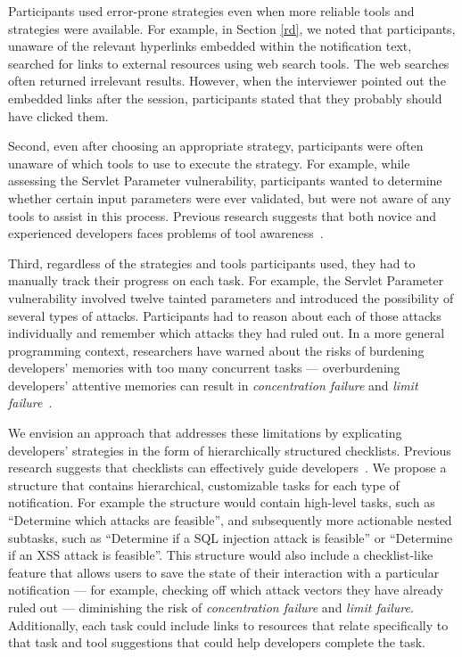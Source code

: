 \documentclass{acm_proc_article-sp}
\begin{document}
Participants used error-prone strategies even when more reliable tools and strategies were available. 
For example, in Section \ref{rd}, we noted that participants, unaware of the relevant hyperlinks embedded within the notification text, searched for links to external resources using web search tools. 
The web searches often returned irrelevant results. 
However, when the interviewer pointed out the embedded links after the session, participants stated that they probably should have clicked them. 

Second, even after choosing an appropriate strategy, participants were often unaware of which tools to use to execute the strategy.
For example, while assessing the Servlet Parameter vulnerability, participants wanted to determine whether certain input parameters were ever validated, but were not aware of any tools to assist in this process.
Previous research suggests that both novice and experienced developers faces problems of tool awareness~\cite{murphy-Hill2012fluency}.

Third, regardless of the strategies and tools participants used, they had to manually track their progress on each task.
For example, the Servlet Parameter vulnerability involved twelve tainted parameters and introduced the possibility of several types of attacks. 
Participants had to reason about each of those attacks individually and remember which attacks they had ruled out.
In a more general programming context, researchers have warned about the risks of burdening developers' memories with too many concurrent tasks 
--- overburdening developers' attentive memories can result in \emph{concentration failure} and \emph{limit failure}~\cite{parnin2012programmer}.

We envision an approach that addresses these limitations by explicating developers' strategies in the form of hierarchically structured checklists.
Previous research suggests that checklists can effectively guide developers~\cite{phang2009triaging}.
We propose a structure that contains hierarchical, customizable tasks for each type of notification.
For example the structure would contain high-level tasks, such as ``Determine which attacks are feasible'', and subsequently more actionable nested subtasks, such as ``Determine if a SQL injection attack is feasible'' or ``Determine if an XSS attack is feasible''.
This structure would also include a checklist-like feature that allows users to save the state of their interaction with a particular notification --- for example, checking off which attack vectors they have already ruled out --- diminishing the risk of \emph{concentration failure} and \emph{limit failure}.
Additionally, each task could include links to resources that relate specifically to that task and tool suggestions that could help developers complete the task.
\end{document}
